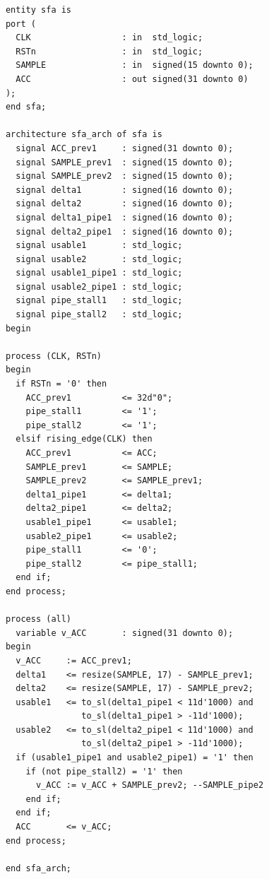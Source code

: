\begin{table}[t!]
\begin{minipage}[t][23cm][t]{0.51\linewidth}
\begin{verbatim}
      entity sfa is
      port (
        CLK                  : in  std_logic;
        RSTn                 : in  std_logic;
        SAMPLE               : in  signed(15 downto 0);
        ACC                  : out signed(31 downto 0)
      );
      end sfa;
      
      architecture sfa_arch of sfa is
        signal ACC_prev1     : signed(31 downto 0);
        signal SAMPLE_prev1  : signed(15 downto 0);
        signal SAMPLE_prev2  : signed(15 downto 0);
        signal delta1        : signed(16 downto 0);
        signal delta2        : signed(16 downto 0);
        signal delta1_pipe1  : signed(16 downto 0);
        signal delta2_pipe1  : signed(16 downto 0);
        signal usable1       : std_logic;
        signal usable2       : std_logic;
        signal usable1_pipe1 : std_logic;
        signal usable2_pipe1 : std_logic;
        signal pipe_stall1   : std_logic;
        signal pipe_stall2   : std_logic;
      begin
      
      process (CLK, RSTn)
      begin
        if RSTn = '0' then
          ACC_prev1          <= 32d"0";
          pipe_stall1        <= '1';     
          pipe_stall2        <= '1';
        elsif rising_edge(CLK) then
          ACC_prev1          <= ACC;
          SAMPLE_prev1       <= SAMPLE;  
          SAMPLE_prev2       <= SAMPLE_prev1;
          delta1_pipe1       <= delta1;  
          delta2_pipe1       <= delta2;
          usable1_pipe1      <= usable1; 
          usable2_pipe1      <= usable2;
          pipe_stall1        <= '0';     
          pipe_stall2        <= pipe_stall1;
        end if;
      end process;
      
      process (all)
        variable v_ACC       : signed(31 downto 0);
      begin
        v_ACC     := ACC_prev1;
        delta1    <= resize(SAMPLE, 17) - SAMPLE_prev1;
        delta2    <= resize(SAMPLE, 17) - SAMPLE_prev2;
        usable1   <= to_sl(delta1_pipe1 < 11d'1000) and 
                     to_sl(delta1_pipe1 > -11d'1000);
        usable2   <= to_sl(delta2_pipe1 < 11d'1000) and 
                     to_sl(delta2_pipe1 > -11d'1000);
        if (usable1_pipe1 and usable2_pipe1) = '1' then
          if (not pipe_stall2) = '1' then
            v_ACC := v_ACC + SAMPLE_prev2; --SAMPLE_pipe2
          end if;
        end if;
        ACC       <= v_ACC;
      end process;
      
      end sfa_arch;
    \end{verbatim}
    \label{fig:SFAVHDL}
  \end{minipage}
\end{table}

